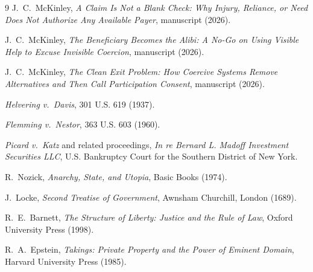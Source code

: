 \documentclass[12pt]{article}
\begin{document}
\begin{thebibliography}{9}
J.\ C.\ McKinley,
\textit{A Claim Is Not a Blank Check: Why Injury, Reliance, or Need Does Not Authorize Any Available Payer},
manuscript (2026).

J.\ C.\ McKinley,
\textit{The Beneficiary Becomes the Alibi: A No-Go on Using Visible Help to Excuse Invisible Coercion},
manuscript (2026).

J.\ C.\ McKinley,
\textit{The Clean Exit Problem: How Coercive Systems Remove Alternatives and Then Call Participation Consent},
manuscript (2026).

\textit{Helvering v.\ Davis},
301 U.S. 619 (1937).

\textit{Flemming v.\ Nestor},
363 U.S. 603 (1960).

\textit{Picard v.\ Katz} and related proceedings,
\textit{In re Bernard L. Madoff Investment Securities LLC},
U.S. Bankruptcy Court for the Southern District of New York.

R.\ Nozick,
\textit{Anarchy, State, and Utopia},
Basic Books (1974).

J.\ Locke,
\textit{Second Treatise of Government},
Awnsham Churchill, London (1689).

R.\ E.\ Barnett,
\textit{The Structure of Liberty: Justice and the Rule of Law},
Oxford University Press (1998).

R.\ A.\ Epstein,
\textit{Takings: Private Property and the Power of Eminent Domain},
Harvard University Press (1985).

\end{thebibliography}
\end{document}
